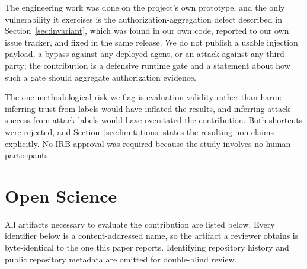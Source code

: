 \documentclass[letterpaper,twocolumn,10pt]{article}
\begin{document}
The engineering work was done on the project's own prototype, and the only
vulnerability it exercises is the authorization-aggregation defect described in
Section~\ref{sec:invariant}, which was found in our own code, reported to our own
issue tracker, and fixed in the same release. We do not publish a usable
injection payload, a bypass against any deployed agent, or an attack against any
third party; the contribution is a defensive runtime gate and a statement about
how such a gate should aggregate authorization evidence.

The one methodological risk we flag is evaluation validity rather than harm:
inferring trust from labels would have inflated the results, and inferring attack
success from attack labels would have overstated the contribution. Both
shortcuts were rejected, and Section~\ref{sec:limitations} states the resulting
non-claims explicitly. No IRB approval was required because the study involves
no human participants.

\cleardoublepage

\section*{Open Science}

All artifacts necessary to evaluate the contribution are listed below. Every
identifier below is a content-addressed name, so the artifact a reviewer
obtains is byte-identical to the one this paper reports. Identifying
repository history and public repository metadata are omitted for double-blind
review.
\end{document}
